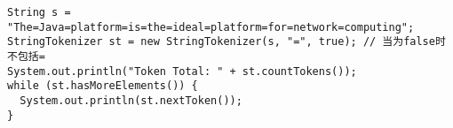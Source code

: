 \begin{lstlisting}
String s = "The=Java=platform=is=the=ideal=platform=for=network=computing";
StringTokenizer st = new StringTokenizer(s, "=", true); // 当为false时不包括=
System.out.println("Token Total: " + st.countTokens());
while (st.hasMoreElements()) {
  System.out.println(st.nextToken());
}
\end{lstlisting}
